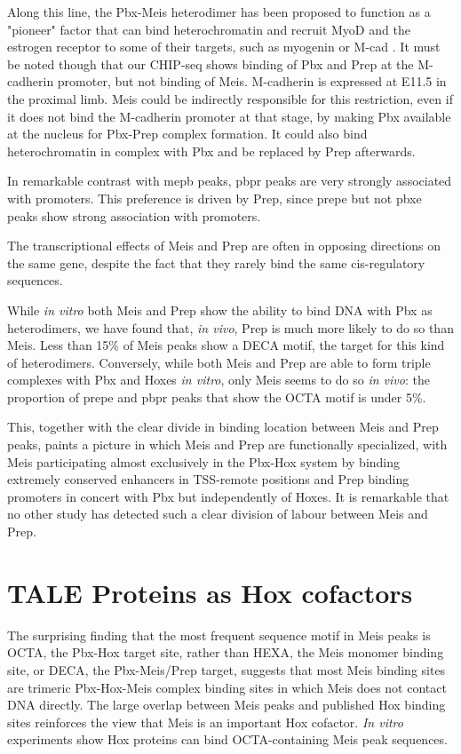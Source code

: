 Along this line, the Pbx-Meis heterodimer has been proposed to function as a "pioneer" factor that can bind heterochromatin and recruit MyoD and the estrogen receptor to some of their targets, such as myogenin or M-cad \parencite{Berkes2004, Magnani2011}. It must be noted though that our \ac{CHIP}-seq shows binding of Pbx and Prep at the M-cadherin promoter, but not binding of Meis. M-cadherin is expressed at E11.5 in the proximal limb. Meis could be indirectly responsible for this restriction, even if it does not bind the M-cadherin promoter at that stage, by making Pbx available at the nucleus for Pbx-Prep complex formation. It could also bind heterochromatin in complex with Pbx and be replaced by Prep afterwards.  %

In remarkable contrast with \ac{mepb} peaks, \ac{pbpr} peaks are very strongly associated with promoters. This preference is driven by Prep, since \ac{prepe} but not \ac{pbxe} peaks show strong association with promoters.  

The transcriptional effects of Meis and Prep are often in opposing directions on the same gene, despite the fact that they rarely bind the same cis-regulatory sequences.%

While \textit{in vitro} both Meis and Prep show the ability to bind DNA with Pbx as heterodimers, we have found that, \textit{in vivo}, Prep is much more likely to do so than Meis. Less than 15\% of Meis peaks show a \ac{DECA} motif, the target for this kind of heterodimers. Conversely, while both Meis and Prep are able to form triple complexes with Pbx and Hoxes \textit{in vitro}, only Meis seems to do so \textit{in vivo}: the proportion of \ac{prepe} and \ac{pbpr} peaks that show the \ac{OCTA} motif is under 5\%. 

This, together with the clear divide in binding location between Meis and Prep peaks, paints a picture in which Meis and Prep are functionally specialized, with Meis participating almost exclusively in the Pbx-Hox system by binding extremely conserved enhancers in \ac{TSS}-remote positions and Prep binding promoters in concert with Pbx but independently of Hoxes. It is remarkable that no other study has detected such a clear division of labour between Meis and Prep.

\section{TALE Proteins as Hox cofactors}

The surprising finding that the most frequent sequence motif in Meis peaks is \ac{OCTA}, the Pbx-Hox target site, rather than \ac{HEXA}, the Meis monomer binding site, or \ac{DECA}, the Pbx-Meis/Prep target, suggests that most Meis binding sites are trimeric Pbx-Hox-Meis complex binding sites in which Meis does not contact DNA directly. The large overlap between Meis peaks and published Hox binding sites reinforces the view that Meis is an important Hox cofactor. \textit{In vitro} experiments show Hox proteins can bind \ac{OCTA}-containing Meis peak sequences. 

